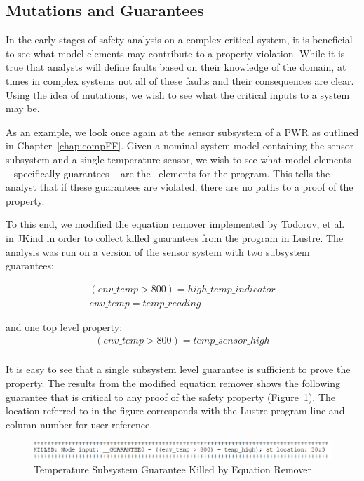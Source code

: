 \subsection{Mutations and Guarantees}
\label{sec:granularityMutationInputs}
In the early stages of safety analysis on a complex critical system, it is beneficial to see what model elements may contribute to a property violation. While it is true that analysts will define faults based on their knowledge of the domain, at times in complex systems not all of these faults and their consequences are clear. Using the idea of mutations, we wish to see what the critical inputs to a system may be. 

As an example, we look once again at the sensor subsystem of a PWR as outlined in Chapter~\ref{chap:compFF}. Given a nominal system model containing the sensor subsystem and a single temperature sensor, we wish to see what model elements -- specifically guarantees -- are the \mustcov\  elements for the program. This tells the analyst that if these guarantees are violated, there are no paths to a proof of the property. 

To this end, we modified the equation remover implemented by Todorov, et al.~\cite{NFM2020Todorov} in JKind in order to collect killed guarantees from the program in Lustre. The analysis was run on a version of the sensor system with two subsystem guarantees: 

\begin{gather*}
\mathit{(env\_temp > 800) = high\_temp\_indicator}\\
\mathit{env\_temp = temp\_reading}
\end{gather*}

and one top level property:
\begin{gather*}
\mathit{(env\_temp > 800) = temp\_sensor\_high}\\
\end{gather*}

It is easy to see that a single subsystem level guarantee is sufficient to prove the property. The results from the modified equation remover shows the following guarantee that is critical to any proof of the safety property (Figure~\ref{fig:guaranteesKilledSensor}). The location referred to in the figure corresponds with the Lustre program line and column number for user reference.

\begin{figure}[h]
	\begin{center}
		\includegraphics[scale=0.8]{images/guaranteesKilledSensor.PNG}
	\end{center}
	\caption{Temperature Subsystem Guarantee Killed by Equation Remover}
	\label{fig:guaranteesKilledSensor}
\end{figure}

